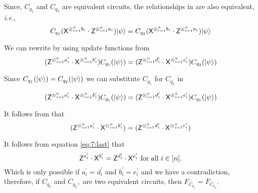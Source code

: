 \begin{flushleft}
Since, $C_{q_1}$ and $C_{q_2}$ are equivalent circuits,  the relationships in  are also equivalent, \emph{i.e.},
 \begin{equation}
  \label{eq:4}
C_{q_1} ({\sf X}^{\otimes_{i=1}^{n} b_{i}} \cdot {\sf Z}^{\otimes_{i=1}^{n}a_{i}}){\lvert}\psi\rangle=C_{q_2} ({\sf X}^{\otimes_{i=1}^{n} b_{i}} \cdot {\sf Z}^{\otimes_{i=1}^{n}a_{i}}){\lvert}\psi\rangle
\end{equation}

We can rewrite  by using update functions from 
 \begin{equation}
  \label{eq:5:last}
({\sf Z}^{\otimes_{i=1}^{n} a_{i}^\prime} \cdot {\sf X}^{\otimes_{i=1}^{n} b_{i}^\prime})C_{q_1}({\lvert}\psi\rangle)=({\sf Z}^{\otimes_{i=1}^{n} d_{i}^\prime} \cdot {\sf X}^{\otimes_{i=1}^{n} e_{i}^\prime})C_{q_2}({\lvert}\psi\rangle)
\end{equation}

Since $C_{q_1}({\lvert}\psi\rangle)=C_{q_2}({\lvert}\psi\rangle)$ we can substitute $C_{q_1}$ for $C_{q_2}$ in 

\begin{equation}
  \label{eq:6:last}
({\sf Z}^{\otimes_{i=1}^{n} a_{i}^\prime} \cdot {\sf X}^{\otimes_{i=1}^{n} b_{i}^\prime})C_{q_1}({\lvert}\psi\rangle)=({\sf Z}^{\otimes_{i=1}^{n} d_{i}^\prime} \cdot {\sf X}^{\otimes_{i=1}^{n} e_{i}^\prime})C_{q_1}({\lvert}\psi\rangle)
\end{equation}

It follows from  that
\begin{equation}
  \label{eq:7:last}
({\sf Z}^{\otimes_{i=1}^{n} a_{i}^\prime} \cdot {\sf X}^{\otimes_{i=1}^{n} b_{i}^\prime})=({\sf Z}^{\otimes_{i=1}^{n} d_{i}^\prime} \cdot {\sf X}^{\otimes_{i=1}^{n} e_{i}^\prime})
\end{equation}

It follows from equation \ref{eq:7:last}  that $${\sf Z}^{a_i^\prime} \cdot {\sf X}^{b_i^\prime}={\sf Z}^{d_i^\prime} \cdot {\sf X}^{e_i^\prime} \mbox{ for all } i\in[n].$$ Which is only possible if $a_i^\prime=d_i^\prime$ and  $b_i^\prime=e_i^\prime$ and we have a contradiction, therefore, if $C_{q_1}$ and $C_{q_2},$ are two equivalent circuits, then $F_{C_{q_1}}=F_{C_{q_2}}.$
\end{flushleft}





